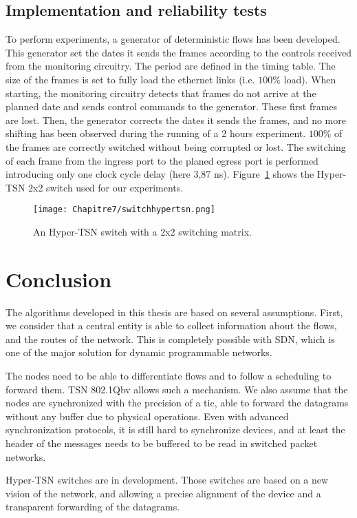 \subsection{Implementation and reliability tests}

To perform experiments, a generator of deterministic flows has been developed. This generator set the dates it sends the frames according to the controls received from the monitoring circuitry. The period are defined in the timing table. The size of the frames is set to fully load the ethernet links (i.e. $100\%$ load).
When starting, the monitoring circuitry detects that frames do not arrive at the planned date and sends control commands to the generator. These first frames are lost. Then, the generator corrects the dates it sends the frames, and no more shifting has been observed during the running of a 2 hours experiment. $100\%$ of the frames are correctly switched without being corrupted or lost. The switching of each frame from the ingress port to the planed egress port is performed introducing only one clock cycle delay (here 3,87 ns).
Figure~\ref{fig:hypertsnswitch} shows the Hyper-TSN 2x2 switch used for our experiments.
\begin{center}

\begin{figure}[h]
  \centering
\texttt{[image: Chapitre7/switchhypertsn.png]}
\caption{ An Hyper-TSN switch with a 2x2 switching matrix.}
\label{fig:hypertsnswitch}
\end{figure}
\end{center}


\section*{Conclusion}

The algorithms developed in this thesis are based on several assumptions. First, we consider that a central entity is able to collect information about the flows, and the routes of the network. This is completely possible with SDN, which is one of the major solution for dynamic programmable networks. 

The nodes need to be able to differentiate flows and to follow a scheduling to forward them. TSN 802.1Qbv allows such a mechanism.
We also assume that the nodes are synchronized with the precision of a tic, able to forward the datagrams without any buffer due to physical operations. Even with advanced synchronization protocols, it is still hard to synchronize devices, and at least the header of the messages needs to be buffered to be read in switched packet networks.

Hyper-TSN switches are in development. Those switches are based on a new vision of the network, and allowing a precise alignment of the device and a transparent forwarding of the datagrams.